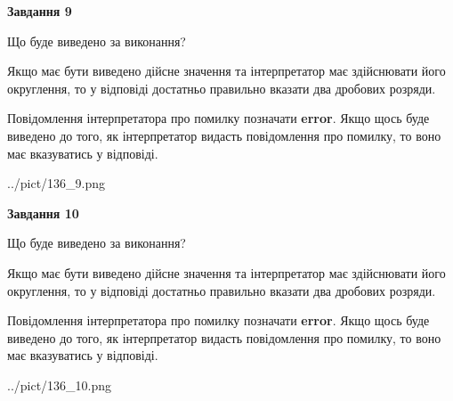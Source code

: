 \documentclass[12pt, ukrainian]{article}
\begin{document}
{\begin {Large}
{\begin {center}\textbf{Завдання 9}\end {center}}\par
Що буде виведено за виконання? \par

Якщо має бути виведено дійсне значення та інтерпретатор має здійснювати його округлення, 
то у відповіді достатньо правильно вказати два дробових розряди.

Повідомлення інтерпретатора про помилку позначати \textbf{error}.
Якщо щось буде виведено до того, як інтерпретатор видасть повідомлення про помилку, 
то воно має вказуватись у відповіді. \par

\begin{center}
	{../pict/136_9.png}
\end{center}
\newpage

{\begin {center}\textbf{Завдання 10}\end {center}}\par
Що буде виведено за виконання? \par

Якщо має бути виведено дійсне значення та інтерпретатор має здійснювати його округлення, 
то у відповіді достатньо правильно вказати два дробових розряди.

Повідомлення інтерпретатора про помилку позначати \textbf{error}.
Якщо щось буде виведено до того, як інтерпретатор видасть повідомлення про помилку, 
то воно має вказуватись у відповіді. \par

\begin{center}
	{../pict/136_10.png}
\end{center}
\newpage

\end {Large}}
\end{document}
